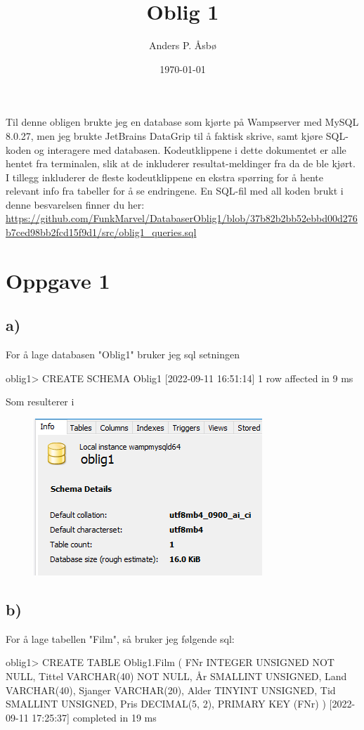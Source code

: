 \documentclass[%
notitlepage,
 amsmath,amssymb,
 aps,
rmp,
]{revtex4-2}  %
\begin{document}
\title{Oblig 1}   %
\author{Anders P. Åsbø}               %
\date{\today}                             %
\noaffiliation                            %

\maketitle                                %

Til denne obligen brukte jeg en database som kjørte på Wampserver med MySQL 8.0.27, men jeg brukte JetBrains DataGrip til å faktisk skrive, samt kjøre SQL-koden og interagere med databasen. Kodeutklippene i dette dokumentet er alle hentet fra terminalen, slik at de inkluderer resultat-meldinger fra da de ble kjørt. I tillegg inkluderer de fleste kodeutklippene en ekstra spørring for å hente relevant info fra tabeller for å se endringene. En SQL-fil med all koden brukt i denne besvarelsen finner du her: \sloppy\url{https://github.com/FunkMarvel/DatabaserOblig1/blob/37b82b2bb52ebbd00d276b7ced98bb2fcd15f9d1/src/oblig1_queries.sql}

\section*{Oppgave 1}
\subsection*{a)}
For å lage databasen "Oblig1" bruker jeg sql setningen
\begin{sql}
oblig1> CREATE SCHEMA Oblig1
[2022-09-11 16:51:14] 1 row affected in 9 ms
\end{sql}
Som resulterer i
\begin{figure}[H]
\centering\includegraphics[scale=1]{op1a.png}
\end{figure}

\subsection*{b)}
For å lage tabellen "Film", så bruker jeg følgende sql:
\begin{sql}
oblig1> CREATE TABLE Oblig1.Film (
            FNr INTEGER UNSIGNED NOT NULL,
            Tittel VARCHAR(40) NOT NULL,
            År SMALLINT UNSIGNED,
            Land VARCHAR(40),
            Sjanger VARCHAR(20),
            Alder TINYINT UNSIGNED,
            Tid SMALLINT UNSIGNED,
            Pris DECIMAL(5, 2),
            PRIMARY KEY (FNr)
        )
[2022-09-11 17:25:37] completed in 19 ms
\end{sql}
\end{document}
